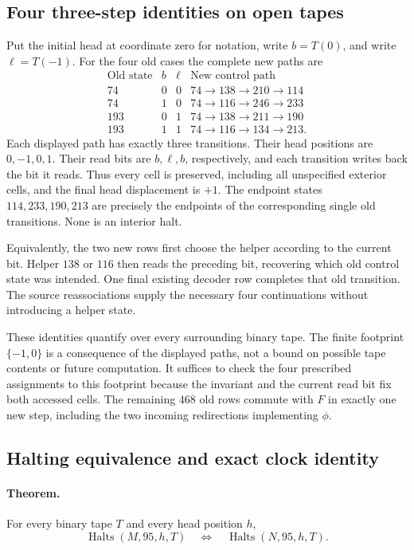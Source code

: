 \subsection{Four three-step identities on open tapes}

Put the initial head at coordinate zero for notation, write $b=T(0)$, and
write $\ell=T(-1)$.  For the four old cases the complete new paths are
\[
\begin{array}{c|c|c|c}
\text{Old state}&b&\ell&\text{New control path}\\\hline
74&0&0&74\to138\to210\to114\\
74&1&0&74\to116\to246\to233\\
193&0&1&74\to138\to211\to190\\
193&1&1&74\to116\to134\to213.
\end{array}
\]
Each displayed path has exactly three transitions.  Their head positions
are $0,-1,0,1$.  Their read bits are $b,\ell,b$, respectively, and each
transition writes back the bit it reads.  Thus every cell is preserved,
including all unspecified exterior cells, and the final head displacement
is $+1$.  The endpoint states $114,233,190,213$ are precisely the endpoints
of the corresponding single old transitions.  None is an interior halt.

Equivalently, the two new rows first choose the helper according to the
current bit.  Helper $138$ or $116$ then reads the preceding bit, recovering
which old control state was intended.  One final existing decoder row
completes that old transition.  The source reassociations supply the
necessary four continuations without introducing a helper state.

These identities quantify over every surrounding binary tape.  The finite
footprint $\{-1,0\}$ is a consequence of the displayed paths, not a bound on
possible tape contents or future computation.  It suffices to check the
four prescribed assignments to this footprint because the invariant and
the current read bit fix both accessed cells.  The remaining $468$ old rows
commute with $F$ in exactly one new step, including the two incoming
redirections implementing $\phi$.

\subsection{Halting equivalence and exact clock identity}

\paragraph{Theorem.}
For every binary tape $T$ and every head position $h$,
\[
\operatorname{Halts}(M,95,h,T)
\quad\Longleftrightarrow\quad
\operatorname{Halts}(N,95,h,T).
\]

